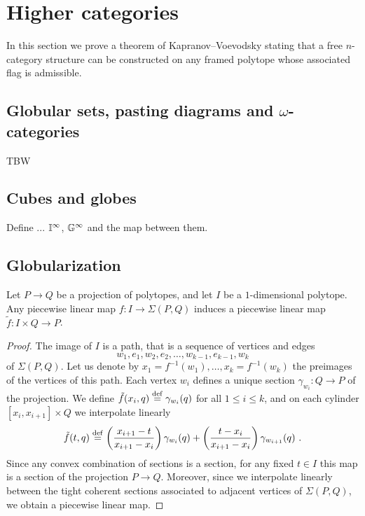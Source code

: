 
\section{Higher categories}

In this section we prove a theorem of Kapranov--Voevodsky \cite{kapranov1991polycategory} stating that a free $n$-category structure can be constructed on any framed polytope whose associated flag is admissible.

\subsection{Globular sets, pasting diagrams and $\omega$-categories}

TBW

\subsection{Cubes and globes}

Define ... $\mathbb{I}^\infty$, $\mathbb{G}^\infty$ and the map between them.

\subsection{Globularization} 
\label{ss:globularization}


\begin{lemma}
	\label{l:adjunction-I}
	Let $P \to Q$ be a projection of polytopes, and let $I$ be a $1$-dimensional polytope. 
	Any piecewise linear map $f \colon I \to \Sigma(P,Q)$ induces a piecewise linear map $\tilde f \colon I \times Q \to P$. 
\end{lemma}

\begin{proof}
	The image of $I$ is a path, that is a sequence of vertices and edges $$w_1,e_1,w_2,e_2,\ldots,w_{k-1},e_{k-1},w_k$$ of $\Sigma(P,Q)$. 
	Let us denote by $x_1=f^{-1}(w_1),\ldots, x_k=f^{-1}(w_k)$ the preimages of the vertices of this path. 
	Each vertex $w_i$ defines a unique section $\gamma_{w_i} : Q \to P$ of the projection.
	We define $\tilde f (x_i, q) \stackrel{\mathrm{def}}{=} \gamma_{w_i}(q)$ for all $1 \leq i \leq k$, and on each cylinder $[x_i,x_{i+1}] \times Q$ we interpolate linearly
	\[
	\tilde f (t,q) \defeq \left( \frac{x_{i+1}-t}{x_{i+1}-x_i} \right) \gamma_{w_i}(q) + \left( \frac{t-x_i}{x_{i+1}-x_i} \right) \gamma_{w_{i+1}}(q) \ .
	\]
	Since any convex combination of sections is a section, for any fixed $t\in I$ this map is a section of the projection $P \to Q$.
	Moreover, since we interpolate linearly between the tight coherent sections associated to adjacent vertices of $\Sigma(P,Q)$, we obtain a piecewise linear map. 
\end{proof}

